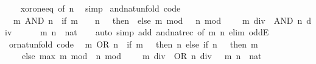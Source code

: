 \begin{isabellebody}
%
\isadelimproof
\ \ %
\endisadelimproof
%
\isatagproof
{}\isamarkupfalse%
\ xor{\isacharunderscore}{\kern0pt}one{\isacharunderscore}{\kern0pt}eq\ {\isacharbrackleft}{\kern0pt}of\ n{\isacharbrackright}{\kern0pt}\ \isamarkupfalse%
\ simp%
\endisatagproof
{\isafoldproof}%
%
\isadelimproof
\isanewline
%
\endisadelimproof
\isanewline
{}\isamarkupfalse%
\ and{\isacharunderscore}{\kern0pt}nat{\isacharunderscore}{\kern0pt}unfold\ {\isacharbrackleft}{\kern0pt}code{\isacharbrackright}{\kern0pt}{\isacharcolon}{\kern0pt}\isanewline
\ \ {\isacartoucheopen}m\ AND\ n\ {\isacharequal}{\kern0pt}\ {\isacharparenleft}{\kern0pt}if\ m\ {\isacharequal}{\kern0pt}\ {}\ {\isasymor}\ n\ {\isacharequal}{\kern0pt}\ {}\ then\ {}\ else\ {\isacharparenleft}{\kern0pt}m\ mod\ {}{\isacharparenright}{\kern0pt}\ {\isacharasterisk}{\kern0pt}\ {\isacharparenleft}{\kern0pt}n\ mod\ {}{\isacharparenright}{\kern0pt}\ {\isacharplus}{\kern0pt}\ {}\ {\isacharasterisk}{\kern0pt}\ {\isacharparenleft}{\kern0pt}{\isacharparenleft}{\kern0pt}m\ div\ {}{\isacharparenright}{\kern0pt}\ AND\ {\isacharparenleft}{\kern0pt}n\ div\ {}{\isacharparenright}{\kern0pt}{\isacharparenright}{\kern0pt}{\isacharparenright}{\kern0pt}{\isacartoucheclose}\isanewline
\ \ \ \ \ m\ n\ {\isacharcolon}{\kern0pt}{\isacharcolon}{\kern0pt}\ nat\isanewline
%
\isadelimproof
\ \ %
\endisadelimproof
%
\isatagproof
{}\isamarkupfalse%
\ {\isacharparenleft}{\kern0pt}auto\ simp\ add{\isacharcolon}{\kern0pt}\ and{\isacharunderscore}{\kern0pt}nat{\isacharunderscore}{\kern0pt}rec\ {\isacharbrackleft}{\kern0pt}of\ m\ n{\isacharbrackright}{\kern0pt}\ elim{\isacharcolon}{\kern0pt}\ oddE{\isacharparenright}{\kern0pt}%
\endisatagproof
{\isafoldproof}%
%
\isadelimproof
\isanewline
%
\endisadelimproof
\isanewline
{}\isamarkupfalse%
\ or{\isacharunderscore}{\kern0pt}nat{\isacharunderscore}{\kern0pt}unfold\ {\isacharbrackleft}{\kern0pt}code{\isacharbrackright}{\kern0pt}{\isacharcolon}{\kern0pt}\isanewline
\ \ {\isacartoucheopen}m\ OR\ n\ {\isacharequal}{\kern0pt}\ {\isacharparenleft}{\kern0pt}if\ m\ {\isacharequal}{\kern0pt}\ {}\ then\ n\ else\ if\ n\ {\isacharequal}{\kern0pt}\ {}\ then\ m\isanewline
\ \ \ \ else\ max\ {\isacharparenleft}{\kern0pt}m\ mod\ {}{\isacharparenright}{\kern0pt}\ {\isacharparenleft}{\kern0pt}n\ mod\ {}{\isacharparenright}{\kern0pt}\ {\isacharplus}{\kern0pt}\ {}\ {\isacharasterisk}{\kern0pt}\ {\isacharparenleft}{\kern0pt}{\isacharparenleft}{\kern0pt}m\ div\ {}{\isacharparenright}{\kern0pt}\ OR\ {\isacharparenleft}{\kern0pt}n\ div\ {}{\isacharparenright}{\kern0pt}{\isacharparenright}{\kern0pt}{\isacharparenright}{\kern0pt}{\isacartoucheclose}\ \ m\ n\ {\isacharcolon}{\kern0pt}{\isacharcolon}{\kern0pt}\ nat\isanewline

\end{isabellebody}
